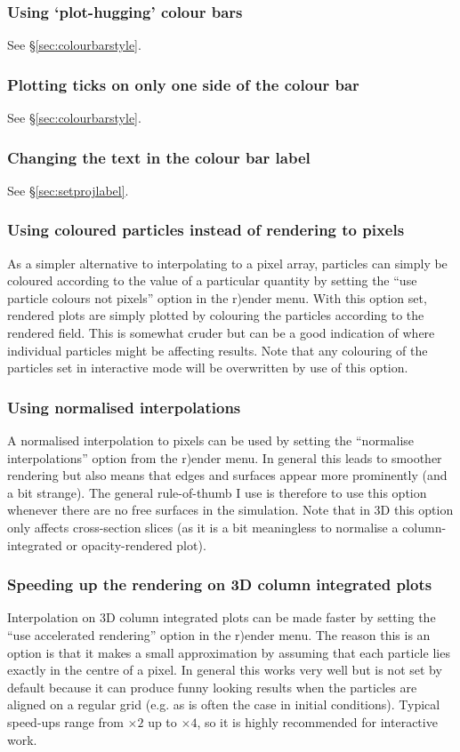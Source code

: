 \documentclass[a4paper,10pt]{article}
\begin{document}
\subsubsection{ Using `plot-hugging' colour bars}
 See \S\ref{sec:colourbarstyle}.

\subsubsection{ Plotting ticks on only one side of the colour bar}
 See \S\ref{sec:colourbarstyle}.

\subsubsection{ Changing the text in the colour bar label}
See \S\ref{sec:setprojlabel}.

\subsubsection{ Using coloured particles instead of rendering to pixels}
\label{sec:colournotrender}
 As a simpler alternative to interpolating to a pixel array, particles can simply be coloured according to the value of a particular quantity by setting the ``use particle colours not pixels'' option in the r)ender menu. With this option set, rendered plots are simply plotted by colouring the particles according to the rendered field. This is somewhat
cruder but can be a good indication of where individual particles might be affecting results.
Note that any colouring of the particles set in interactive mode will be overwritten by use of this option.

\subsubsection{ Using normalised interpolations}
  A normalised interpolation to pixels can be used by setting the ``normalise interpolations'' option from the r)ender menu. In general this leads to smoother rendering but also means that edges and surfaces appear
more prominently (and a bit strange). The general rule-of-thumb I use is therefore to use this option whenever there are no free surfaces in the simulation. Note that in 3D this option only affects cross-section slices (as it is a bit meaningless to normalise a column-integrated or opacity-rendered plot). 

\subsubsection{ Speeding up the rendering on 3D column integrated plots}
 Interpolation on 3D column integrated plots can be made faster by setting the ``use accelerated rendering'' option in the r)ender menu. The reason this is an option is that it makes a small approximation by assuming that each particle lies exactly in the centre of a pixel.  In general this works very well but is not set by default because it can produce funny looking results when the particles are aligned on a regular grid (e.g. as is often the case in initial conditions). Typical speed-ups range from $\times 2$ up to $\times 4$, so it is highly recommended for interactive work.
\end{document}
